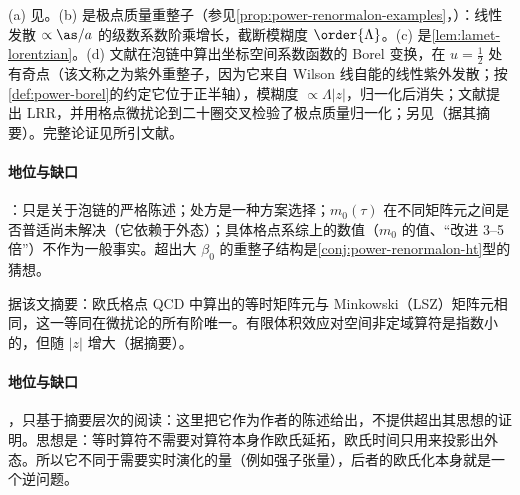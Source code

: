 \begin{proofsketch}
(a) 见\cite{Ji:2020brr}。(b) 是极点质量重整子\cite{Beneke:1994sw,Bigi:1994em}（参见\cref{prop:power-renormalon-examples}，\tagP）：线性发散 $\propto\as/a$ 的级数系数阶乘增长，截断模糊度 $\order{\Lambda}$。(c) 是\cref{lem:lamet-lorentzian}。(d) 文献\cite{Braun:2018brg}在泡链中算出坐标空间系数函数的 Borel 变换，在 $u=\frac12$ 处有奇点（该文称之为紫外重整子，因为它来自 Wilson 线自能的线性紫外发散；按\cref{def:power-borel}的约定它位于正半轴），模糊度 $\propto\Lambda|z|$，归一化后消失；文献\cite{Zhang:2023bxs}提出 LRR，并用格点微扰论到二十圈交叉检验了极点质量归一化；另见\cite{Holligan:2023rex}（据其摘要）。完整论证见所引文献。
\end{proofsketch}

\paragraph{地位与缺口}
\tagP：只是关于泡链的严格陈述；处方是一种方案选择；$m_0(\tau)$ 在不同矩阵元之间是否普适尚未解决（它依赖于外态\cite{Zhang:2023bxs}）；具体格点系综上的数值（$m_0$ 的值、“改进 3--5 倍”）不作为一般事实。超出大 $\beta_0$ 的重整子结构是\cref{conj:power-renormalon-ht}型的猜想。

\begin{proposition}\label{prop:lamet-euclid-minkowski}
据该文摘要\cite{Briceno:2017cpo}：欧氏格点 QCD 中算出的等时矩阵元与 Minkowski（LSZ）矩阵元相同，这一等同在微扰论的所有阶唯一。有限体积效应对空间非定域算符是指数小的，但随 $|z|$ 增大（据\cite{Briceno:2018lfj}摘要）。
\end{proposition}

\paragraph{地位与缺口}
\tagA，只基于摘要层次的阅读：这里把它作为作者的陈述给出，不提供超出其思想的证明。思想是：等时算符不需要对算符本身作欧氏延拓，欧氏时间只用来投影出外态。所以它不同于需要实时演化的量（例如强子张量），后者的欧氏化本身就是一个逆问题。

